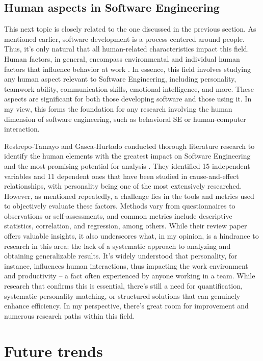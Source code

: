 \documentclass[11pt]{article}
\begin{document}
\subsection{Human aspects in Software Engineering}

This next topic is closely related to the one discussed in the previous section. As mentioned earlier, software development is a process centered around people. Thus, it's only natural that all human-related characteristics impact this field. Human factors, in general, encompass environmental and individual human factors that influence behavior at work \cite{def_humanfactors}. In essence, this field involves studying any human aspect relevant to Software Engineering, including personality, teamwork ability, communication skills, emotional intelligence, and more. These aspects are significant for both those developing software and those using it. In my view, this forms the foundation for any research involving the human dimension of software engineering, such as behavioral SE or human-computer interaction.

Restrepo-Tamayo and Gasca-Hurtado conducted thorough literature research to identify the human elements with the greatest impact on Software Engineering and the most promising potential for analysis \cite{restrepo2022human}. They identified 15 independent variables and 11 dependent ones that have been studied in cause-and-effect relationships, with personality being one of the most extensively researched. However, as mentioned repeatedly, a challenge lies in the tools and metrics used to objectively evaluate these factors. Methods vary from questionnaires to observations or self-assessments, and common metrics include descriptive statistics, correlation, and regression, among others. While their review paper offers valuable insights, it also underscores what, in my opinion, is a hindrance to research in this area: the lack of a systematic approach to analyzing and obtaining generalizable results. It's widely understood that personality, for instance, influences human interactions, thus impacting the work environment and productivity – a fact often experienced by anyone working in a team. While research that confirms this is essential, there's still a need for quantification, systematic personality matching, or structured solutions that can genuinely enhance efficiency. In my perspective, there's great room for improvement and numerous research paths within this field.



\section{Future trends}
\end{document}
